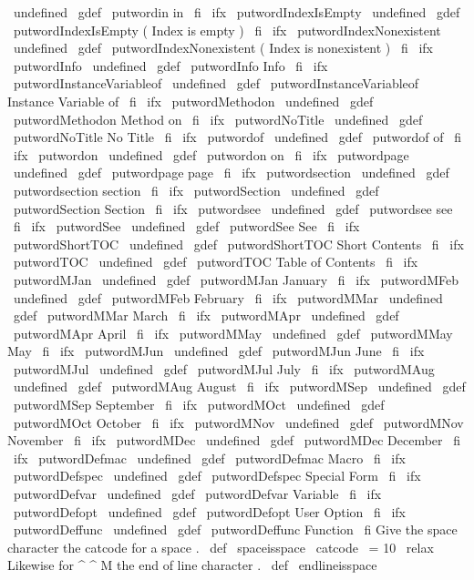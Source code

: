 \
undefined
\
gdef
\
putwordin
{
in
}
\
fi
\
ifx
\
putwordIndexIsEmpty
\
undefined
\
gdef
\
putwordIndexIsEmpty
{
(
Index
is
empty
)
}
\
fi
\
ifx
\
putwordIndexNonexistent
\
undefined
\
gdef
\
putwordIndexNonexistent
{
(
Index
is
nonexistent
)
}
\
fi
\
ifx
\
putwordInfo
\
undefined
\
gdef
\
putwordInfo
{
Info
}
\
fi
\
ifx
\
putwordInstanceVariableof
\
undefined
\
gdef
\
putwordInstanceVariableof
{
Instance
Variable
of
}
\
fi
\
ifx
\
putwordMethodon
\
undefined
\
gdef
\
putwordMethodon
{
Method
on
}
\
fi
\
ifx
\
putwordNoTitle
\
undefined
\
gdef
\
putwordNoTitle
{
No
Title
}
\
fi
\
ifx
\
putwordof
\
undefined
\
gdef
\
putwordof
{
of
}
\
fi
\
ifx
\
putwordon
\
undefined
\
gdef
\
putwordon
{
on
}
\
fi
\
ifx
\
putwordpage
\
undefined
\
gdef
\
putwordpage
{
page
}
\
fi
\
ifx
\
putwordsection
\
undefined
\
gdef
\
putwordsection
{
section
}
\
fi
\
ifx
\
putwordSection
\
undefined
\
gdef
\
putwordSection
{
Section
}
\
fi
\
ifx
\
putwordsee
\
undefined
\
gdef
\
putwordsee
{
see
}
\
fi
\
ifx
\
putwordSee
\
undefined
\
gdef
\
putwordSee
{
See
}
\
fi
\
ifx
\
putwordShortTOC
\
undefined
\
gdef
\
putwordShortTOC
{
Short
Contents
}
\
fi
\
ifx
\
putwordTOC
\
undefined
\
gdef
\
putwordTOC
{
Table
of
Contents
}
\
fi
%
\
ifx
\
putwordMJan
\
undefined
\
gdef
\
putwordMJan
{
January
}
\
fi
\
ifx
\
putwordMFeb
\
undefined
\
gdef
\
putwordMFeb
{
February
}
\
fi
\
ifx
\
putwordMMar
\
undefined
\
gdef
\
putwordMMar
{
March
}
\
fi
\
ifx
\
putwordMApr
\
undefined
\
gdef
\
putwordMApr
{
April
}
\
fi
\
ifx
\
putwordMMay
\
undefined
\
gdef
\
putwordMMay
{
May
}
\
fi
\
ifx
\
putwordMJun
\
undefined
\
gdef
\
putwordMJun
{
June
}
\
fi
\
ifx
\
putwordMJul
\
undefined
\
gdef
\
putwordMJul
{
July
}
\
fi
\
ifx
\
putwordMAug
\
undefined
\
gdef
\
putwordMAug
{
August
}
\
fi
\
ifx
\
putwordMSep
\
undefined
\
gdef
\
putwordMSep
{
September
}
\
fi
\
ifx
\
putwordMOct
\
undefined
\
gdef
\
putwordMOct
{
October
}
\
fi
\
ifx
\
putwordMNov
\
undefined
\
gdef
\
putwordMNov
{
November
}
\
fi
\
ifx
\
putwordMDec
\
undefined
\
gdef
\
putwordMDec
{
December
}
\
fi
%
\
ifx
\
putwordDefmac
\
undefined
\
gdef
\
putwordDefmac
{
Macro
}
\
fi
\
ifx
\
putwordDefspec
\
undefined
\
gdef
\
putwordDefspec
{
Special
Form
}
\
fi
\
ifx
\
putwordDefvar
\
undefined
\
gdef
\
putwordDefvar
{
Variable
}
\
fi
\
ifx
\
putwordDefopt
\
undefined
\
gdef
\
putwordDefopt
{
User
Option
}
\
fi
\
ifx
\
putwordDeffunc
\
undefined
\
gdef
\
putwordDeffunc
{
Function
}
\
fi
%
Give
the
space
character
the
catcode
for
a
space
.
\
def
\
spaceisspace
{
\
catcode
\
=
10
\
relax
}
%
Likewise
for
^
^
M
the
end
of
line
character
.
\
def
\
endlineisspace

